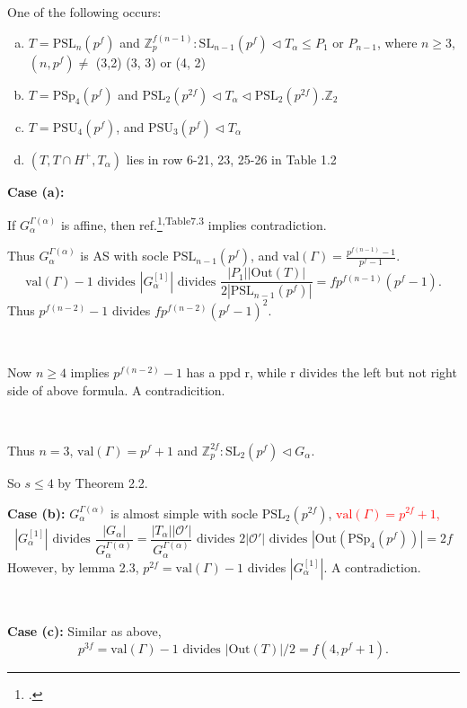 \documentclass{beamer}
\def\SL{\mathrm{SL}}
\def\PSL{\mathrm{PSL}}
\def\PSU{\mathrm{PSU}}
\def\PSp{\mathrm{PSp}}
\def\Out{\mathrm{Out}}
\def\val{\mathrm{val}}
\begin{document}
\begin{frame}
One of the following occurs:
\begin{enumerate}[(a)]
	\item $T=\PSL_n(p^f)$ and $\mathbb{Z}_p^{f(n-1)}:\SL_{n-1}(p^f)\triangleleft T_\alpha\leq P_1$ or $P_{n-1}$, where $n\geq 3$, $(n,p^f)\neq$ (3,2)  (3, 3) or (4, 2)
	\item $T=\PSp_4(p^f)$ and $\PSL_2(p^{2f})\triangleleft T_\alpha\triangleleft \PSL_2(p^{2f}).\mathbb{Z}_2$
	\item $T=\PSU_4(p^f)$, and $\PSU_3(p^f)\triangleleft T_\alpha$
	\item $(T,T\cap H^+,T_\alpha)$ lies in row 6-21, 23, 25-26 in Table 1.2
\end{enumerate}
\end{frame}

\begin{frame}
\textbf{Case (a):}

If $G_\alpha^{\Gamma(\alpha)}$ is affine, then ref.\footcite{Cameron_1999}\textsuperscript{,Table7.3} implies contradiction.

Thus $G_\alpha^{\Gamma(\alpha)}$ is AS with socle $\PSL_{n-1}(p^f)$, and $\val(\Gamma)=\frac{p^{f(n-1)}-1}{p^f-1}$.
\[ \val(\Gamma)-1\text{ divides } |G_\alpha^{[1]}|\text{ divides }\frac{|P_1||\Out(T)|}{2|\PSL_{n-1}(p^f)|}=fp^{f(n-1)}(p^f-1). \]
Thus $p^{f(n-2)}-1$ divides $fp^{f(n-2)}(p^f-1)^2$.

\ 

Now $n\geq 4$ implies $p^{f(n-2)}-1$ has a ppd r, while r divides the left but not right side of above formula. A contradicition.

\ 

Thus $n=3$, $\val(\Gamma)=p^f+1$ and $\mathbb{Z}_p^{2f}:\SL_2(p^f)\triangleleft G_\alpha$.

So $s\leq 4$ by Theorem 2.2.

\end{frame}


\begin{frame}
\textbf{Case (b):} $G_\alpha^{\Gamma(\alpha)}$ is almost simple with socle $\PSL_2(p^{2f})$, \textcolor{red}{$\val(\Gamma)=p^{2f}+1$, }
\[|G_\alpha^{[1]}|\text{ divides }\frac{|G_\alpha|}{G_\alpha^{\Gamma(\alpha)}}=\frac{|T_\alpha||\mathcal{O}'|}{G_\alpha^{\Gamma(\alpha)}}\text{ divides }2|\mathcal{O}'|\text{ divides }|\Out(\PSp_4(p^f))|=2f\]
However, by lemma 2.3, $p^{2f}=\val(\Gamma)-1$ divides $|G_\alpha^{[1]}|$. A contradiction.


\ 

\textbf{Case (c):} Similar as above, \[p^{3f}=\val(\Gamma)-1\text{ divides }|\Out(T)|/2=f(4,p^f+1).\]
\end{frame}
\end{document}
